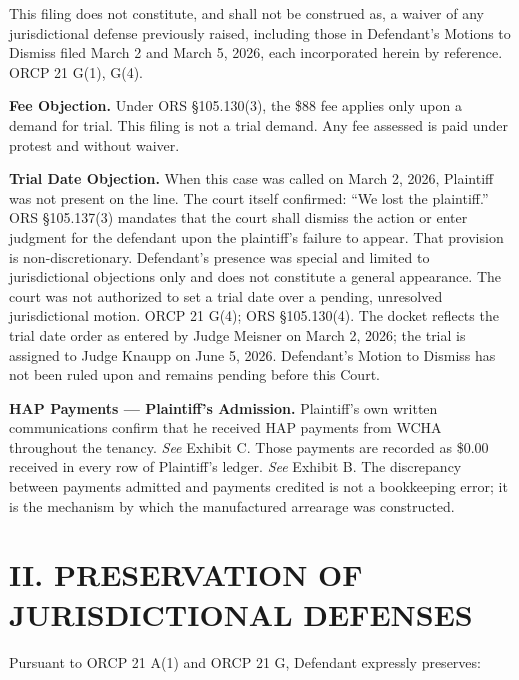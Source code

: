\documentclass[12pt,letterpaper]{article}
\begin{document}
This filing does not constitute, and shall not be construed as, a waiver of any jurisdictional defense previously raised, including those in Defendant's Motions to Dismiss filed March 2 and March 5, 2026, each incorporated herein by reference. ORCP 21 G(1), G(4).

\textbf{Fee Objection.} Under ORS \S105.130(3), the \$88 fee applies only upon a demand for trial. This filing is not a trial demand. Any fee assessed is paid under protest and without waiver.

\textbf{Trial Date Objection.} When this case was called on March 2, 2026, Plaintiff was not present on the line. The court itself confirmed: ``We lost the plaintiff.'' ORS \S105.137(3) mandates that the court shall dismiss the action or enter judgment for the defendant upon the plaintiff's failure to appear. That provision is non-discretionary. Defendant's presence was special and limited to jurisdictional objections only and does not constitute a general appearance. The court was not authorized to set a trial date over a pending, unresolved jurisdictional motion. ORCP 21 G(4); ORS \S105.130(4). The docket reflects the trial date order as entered by Judge Meisner on March 2, 2026; the trial is assigned to Judge Knaupp on June 5, 2026. Defendant's Motion to Dismiss has not been ruled upon and remains pending before this Court.

\textbf{HAP Payments --- Plaintiff's Admission.} Plaintiff's own written communications confirm that he received HAP payments from WCHA throughout the tenancy. \textit{See} Exhibit C. Those payments are recorded as \$0.00 received in every row of Plaintiff's ledger. \textit{See} Exhibit B. The discrepancy between payments admitted and payments credited is not a bookkeeping error; it is the mechanism by which the manufactured arrearage was constructed.

\section*{II. PRESERVATION OF JURISDICTIONAL DEFENSES}

Pursuant to ORCP 21 A(1) and ORCP 21 G, Defendant expressly preserves:
\end{document}
